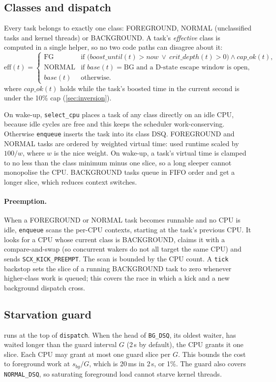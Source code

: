 \documentclass[11pt,a4paper]{article}
\newcommand{\code}[1]{\texttt{#1}}
\begin{document}
\subsection{Classes and dispatch}
Every task belongs to exactly one class: FOREGROUND, NORMAL (unclassified
tasks and kernel threads) or BACKGROUND. A task's \emph{effective} class is
computed in a single helper, so no two code paths can disagree about it:
\begin{equation}
\mathrm{eff}(t)=\begin{cases}
\text{FG} & \text{if } \big(\mathit{boost\_until}(t)>\mathit{now} \ \lor\ \mathit{crit\_depth}(t)>0\big) \land \mathit{cap\_ok}(t),\\
\text{NORMAL} & \text{if } \mathit{base}(t)=\text{BG} \text{ and a D-state escape window is open,}\\
\mathit{base}(t) & \text{otherwise.}
\end{cases}
\end{equation}
where $\mathit{cap\_ok}(t)$ holds while the task's boosted time in the current second is under the 10\% cap (\cref{sec:inversion}).

On wake-up, \code{select\_cpu} places a task of any class directly on an idle
CPU, because idle cycles are free and this keeps the scheduler
work-conserving. Otherwise \code{enqueue} inserts the task into its class
DSQ. FOREGROUND and NORMAL tasks are ordered by weighted virtual time: used
runtime scaled by $100/w$, where $w$ is the nice weight. On wake-up, a task's
virtual time is clamped to no less than the class minimum minus one slice, so
a long sleeper cannot monopolise the CPU. BACKGROUND tasks queue in FIFO order
and get a longer slice, which reduces context switches.

\paragraph{Preemption.}
When a FOREGROUND or NORMAL task becomes runnable and no CPU is idle,
\code{enqueue} scans the per-CPU contexts, starting at the task's previous
CPU. It looks for a CPU whose current class is BACKGROUND, claims it with a
compare-and-swap (so concurrent wakers do not all target the same CPU) and
sends \code{SCX\_KICK\_PREEMPT}. The scan is bounded by the CPU count. A
\code{tick} backstop sets the slice of a running BACKGROUND task to zero
whenever higher-class work is queued; this covers the race in which a kick
and a new background dispatch cross.

\subsection{Starvation guard}
 runs at the top of \code{dispatch}. When the head of
\code{BG\_DSQ}, its oldest waiter, has waited longer than the guard interval
$G$ (2\,s by default), the CPU grants it one slice. Each CPU may grant at
most one guard slice per $G$. This bounds the cost to foreground work at
$s_{bg}/G$, which is 20\,ms in 2\,s, or 1\%. The guard also covers
\code{NORMAL\_DSQ}, so saturating foreground load cannot starve kernel
threads.
\end{document}
